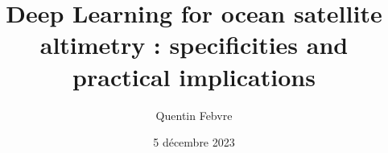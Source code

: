 \author{Quentin Febvre}
\title{Deep Learning for ocean satellite altimetry : specificities and
practical implications}
\date{5 décembre 2023}


